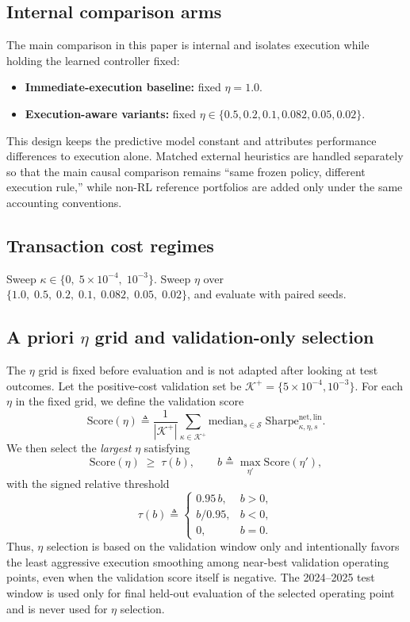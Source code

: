 \documentclass[10pt,twocolumn]{article}
\newcommand{\kappaTC}{\kappa}
\begin{document}
\subsection{Internal comparison arms}
The main comparison in this paper is internal and isolates execution while holding the learned controller fixed:
\begin{itemize}[leftmargin=*,itemsep=1pt]
\item \textbf{Immediate-execution baseline:} fixed $\eta=1.0$.
\item \textbf{Execution-aware variants:} fixed $\eta\in\{0.5, 0.2, 0.1, 0.082, 0.05, 0.02\}$.
\end{itemize}
This design keeps the predictive model constant and attributes performance differences to execution alone. Matched external heuristics are handled separately so that the main causal comparison remains ``same frozen policy, different execution rule,'' while non-RL reference portfolios are added only under the same accounting conventions.

\subsection{Transaction cost regimes}
Sweep $\kappaTC\in\{0,\;5\times10^{-4},\;10^{-3}\}$. Sweep $\eta$ over $\{1.0,\;0.5,\;0.2,\;0.1,\;0.082,\;0.05,\;0.02\}$, and evaluate with paired seeds.

\subsection{A priori $\eta$ grid and validation-only selection}
\label{sec:validation_selection}
The $\eta$ grid is fixed before evaluation and is not adapted after looking at test outcomes. Let the positive-cost validation set be $\mathcal{K}^{+}=\{5\times10^{-4},10^{-3}\}$. For each $\eta$ in the fixed grid, we define the validation score
\[
\mathrm{Score}(\eta)\triangleq \frac{1}{|\mathcal{K}^{+}|}\sum_{\kappa\in\mathcal{K}^{+}}\mathrm{median}_{s\in\mathcal{S}}\;\mathrm{Sharpe}^{\mathrm{net,lin}}_{\kappa,\eta,s}.
\]
We then select the \emph{largest} $\eta$ satisfying
\[
\mathrm{Score}(\eta)\;\ge\;\tau(b),\qquad
b\triangleq \max_{\eta'} \mathrm{Score}(\eta'),
\]
with the signed relative threshold
\[
\tau(b)\triangleq
\begin{cases}
0.95\,b, & b>0,\\
b/0.95, & b<0,\\
0, & b=0.
\end{cases}
\]
Thus, $\eta$ selection is based on the validation window only and intentionally favors the least aggressive execution smoothing among near-best validation operating points, even when the validation score itself is negative. The 2024--2025 test window is used only for final held-out evaluation of the selected operating point and is never used for $\eta$ selection.
\end{document}
